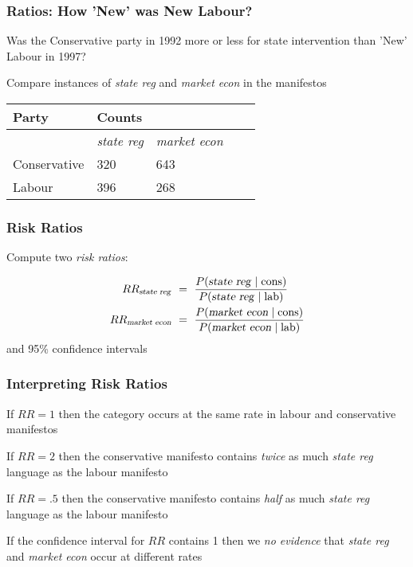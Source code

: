 \documentclass[11pt,compress,professionalfonts]{beamer}
\begin{document}
\begin{frame}[t,fragile]\frametitle{Ratios: How 'New' was New Labour?}

Was the Conservative party in 1992 more or less for state intervention than 'New' Labour in
1997?

Compare instances of \textsl{state reg} and \textsl{market econ} in the manifestos\\
\begin{center}
\begin{tabular}{lllll}\toprule
Party & \multicolumn{2}{l}{Counts}  \\ \midrule
& \textsl{state reg}    &    \textsl{market econ}  \\
Conservative  & 320   & 643 \\
Labour   & 396   & 268      \\ \bottomrule
\end{tabular}
\end{center}

\end{frame}
\begin{frame}[t,fragile]\frametitle{Risk Ratios}

Compute two \textsl{risk ratios}:

\begin{align*}
RR_{\text{\textsl{state reg}}} & ~=~ \frac{P(\text{\textsl{state reg}} \mid \text{cons})}
{P(\text{\textsl{state reg}} \mid \text{lab})}\\
RR_{\text{\textsl{market econ}}} & ~=~ \frac{P(\text{\textsl{market econ}} \mid \text{cons})}
{P(\text{\textsl{market econ}} \mid \text{lab})}
\end{align*}
and 95\% confidence intervals

%
%
%
\end{frame}
\begin{frame}[t,fragile]\frametitle{Interpreting Risk Ratios}

If $RR=1$ then the category occurs at the same rate in labour and conservative manifestos

If $RR=2$ then the conservative manifesto contains \textsl{twice} as much \textsl{state reg} language as the labour manifesto

If $RR=.5$ then the conservative manifesto contains \textsl{half} as much \textsl{state reg} language as the labour manifesto

If the confidence interval for $RR$ contains 1 then we \textsl{no evidence} that \textsl{state reg} and \textsl{market econ} occur at different rates

\end{frame}
\end{document}
